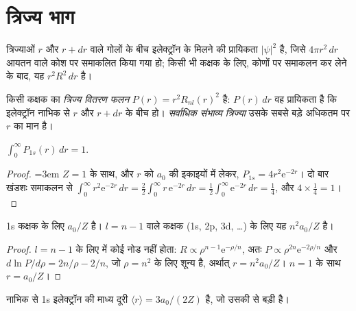 \section{त्रिज्य भाग}

त्रिज्याओं $r$ और $r +
dr$ वाले गोलों के बीच इलेक्ट्रॉन के मिलने की प्रायिकता $|\psi|^2$ है, जिसे $4\pi r^2\,dr$ आयतन वाले कोश पर समाकलित किया गया हो;
किसी भी कक्षक के लिए, कोणों पर समाकलन कर लेने के बाद, यह $r^2R^2\,dr$ है।

\begin{definition}[त्रिज्य वितरण]\label{def:b2:atomic-orbitals:radial-distribution}
किसी कक्षक का \emph{त्रिज्य वितरण फलन}
$P(r) = r^2R_{nl}(r)^2$ है: $P(r)\,dr$ वह प्रायिकता है कि
इलेक्ट्रॉन नाभिक से $r$ और $r + dr$ के बीच हो। \emph{सर्वाधिक संभाव्य
त्रिज्या} उसके सबसे बड़े अधिकतम पर $r$ का मान है।
\end{definition}

\begin{proposition}[1s का प्रसामान्यीकरण]\label{prop:b2:atomic-orbitals:normalised}
$\int_0^\infty P_{1s}(r)\,dr = 1$.
\end{proposition}

\begin{proof}\emergencystretch=3em
$Z = 1$ के साथ, और $r$ को $a_0$ की इकाइयों में लेकर, $P_{1s} = 4r^2\mathrm e^{-2r}$। दो बार खंडशः समाकलन से
$\int_0^\infty r^2\mathrm e^{-2r}\,dr = \frac22\int_0^\infty r\,\mathrm e^{-2r}\,dr =
\frac12\int_0^\infty\mathrm e^{-2r}\,dr = \frac14$, और $4 \times \frac14 = 1$।
\end{proof}

\begin{proposition}[सर्वाधिक संभाव्य त्रिज्या]\label{prop:b2:atomic-orbitals:most-probable}
1s कक्षक के लिए  $a_0/Z$ है। $l =
n - 1$ वाले कक्षक (1s, 2p, 3d, \dots) के लिए यह $n^2a_0/Z$ है।
\end{proposition}

\begin{proof}
$l = n - 1$ के लिए  में कोई नोड नहीं होता: $R \propto \rho^{n-1}\mathrm e^{-\rho/n}$,
अतः $P \propto \rho^{2n}\mathrm e^{-2\rho/n}$ और $d\ln P/d\rho = 2n/\rho - 2/n$, जो
$\rho = n^2$ के लिए शून्य है, अर्थात् $r = n^2a_0/Z$। $n = 1$ के साथ $r = a_0/Z$।
\end{proof}

\begin{proposition}[1s की माध्य त्रिज्या]\label{prop:b2:atomic-orbitals:mean-radius}
नाभिक से 1s इलेक्ट्रॉन की माध्य दूरी $\langle r\rangle = 3a_0/(2Z)$ है,
जो उसकी  से बड़ी है।
\end{proposition}

